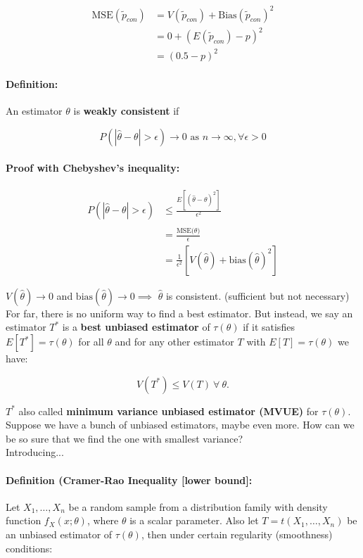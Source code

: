 \documentclass[a4paper, 11pt, twoside]{article}
\begin{document}
\[\begin{split}
	\text{MSE}(\tilde{p}_{con})&=V(\tilde{p}_{con})+\text{Bias}(\tilde{p}_{con})^2\\
	&=0+(E(\tilde{p}_{con})-p)^2\\
	&=(0.5-p)^2
\end{split}
\]

\paragraph{Definition:} An estimator $\theta$ is \textbf{weakly consistent} if

\[P(|\hat{\theta}-\theta|>\epsilon)\to 0\text{ as } n\to \infty, \forall \epsilon>0\]

\paragraph{Proof with Chebyshev's inequality:}

\[\begin{split}
	P(|\hat{\theta}-\theta|>\epsilon) &\leq \frac{E[(\hat{\theta}-\theta)^2]}{\epsilon^2}\\
	&=\frac{\text{MSE}(\hat{\theta)}}{\epsilon}\\
	&=\frac{1}{\epsilon^2}\left[V(\hat{\theta})+\text{bias}(\hat{\theta})^2\right]
\end{split}
\]

$V(\hat{\theta})\to 0$ and $\text{bias}(\hat{\theta})\to 0 \implies$ $\hat{\theta}$ is consistent. (sufficient but not necessary)\\

For far, there is no uniform way to find a best estimator. But instead, we say an estimator $T^*$ is a \textbf{best unbiased estimator} of $\tau(\theta)$ if it satisfies $E[T^*]=\tau(\theta)$ for all $\theta$ and for any other estimator $T$ with $E[T]=\tau(\theta)$ we have:

\[V(T^*)\leq V(T)\ \forall\ \theta.\]

$T^*$ also called \textbf{minimum variance unbiased estimator (MVUE)} for $\tau(\theta)$.\\

Suppose we have a bunch of unbiased estimators, maybe even more. How can we be so sure that we find the one with smallest variance?\\

Introducing...\\

\paragraph{Definition (Cramer-Rao Inequality [lower bound]:} Let $X_1,\dots,X_n$ be a random sample from a distribution family with density function $f_X(x;\theta)$, where $\theta$ is a scalar parameter. Also let $T=t(X_1,\dots,X_n)$ be an unbiased estimator of $\tau(\theta)$, then under certain regularity (smoothness) conditions:
\end{document}

